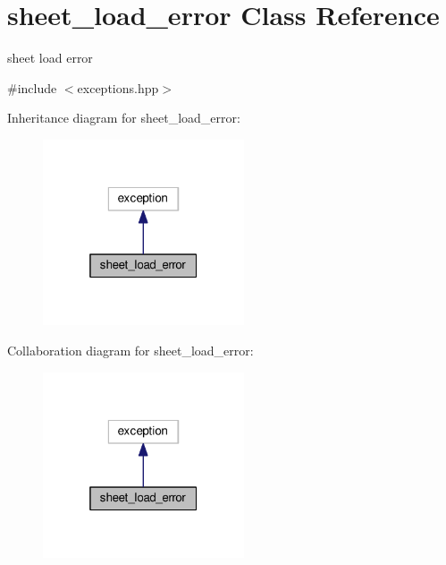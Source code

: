 \hypertarget{classsheet__load__error}{}\section{sheet\+\_\+load\+\_\+error Class Reference}
\label{classsheet__load__error}


sheet load error  




{\ttfamily \#include $<$exceptions.\+hpp$>$}



Inheritance diagram for sheet\+\_\+load\+\_\+error\+:\nopagebreak
\begin{figure}[H]
\begin{center}
\leavevmode
\includegraphics[width=169pt]{classsheet__load__error__inherit__graph}
\end{center}
\end{figure}


Collaboration diagram for sheet\+\_\+load\+\_\+error\+:\nopagebreak
\begin{figure}[H]
\begin{center}
\leavevmode
\includegraphics[width=169pt]{classsheet__load__error__coll__graph}
\end{center}
\end{figure}
